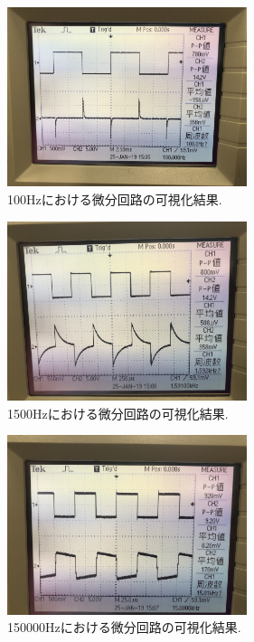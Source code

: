\documentclass[twocolumn, 10pt,a4j]{jsarticle}
\begin{document}
          \begin{figure}[]
            \begin{center}
                \includegraphics[width=7cm]{../img/result_bibun_100hz.jpg}
                \caption{100Hzにおける微分回路の可視化結果.}
            \end{center}
          \end{figure}


          \begin{figure}[]
            \begin{center}
                \includegraphics[width=7cm]{../img/result_bibun_1500hz.jpg}
                \caption{1500Hzにおける微分回路の可視化結果.}
            \end{center}
          \end{figure}


          \begin{figure}[]
            \begin{center}
                \includegraphics[width=7cm]{../img/result_bibun_15000hz.jpg}
                \caption{150000Hzにおける微分回路の可視化結果.}
            \end{center}
          \end{figure}
\end{document}

